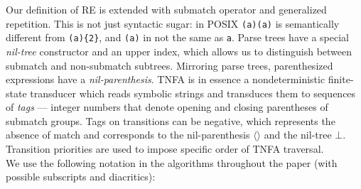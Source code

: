 \documentclass[AMA,STIX1COL]{WileyNJD-v2}
\newcommand{\Xm}{\langle\!\rangle}
\newcommand{\YN}{\mathbb{N}}
\begin{document}
Our definition of RE is extended with submatch operator and generalized repetition.
This is not just syntactic sugar: in POSIX \texttt{(a)(a)} is semantically different from \texttt{(a)\{2\}},
and \texttt{(a)} in not the same as \texttt{a}.
Parse trees have a special \emph{nil-tree} constructor
and an upper index, which allows us to distinguish between submatch and non-submatch subtrees.
Mirroring parse trees, parenthesized expressions have a \emph{nil-parenthesis}.
TNFA is in essence a nondeterministic finite-state transducer
which reads symbolic strings and transduces them to sequences of
\emph{tags} --- integer numbers that denote opening and closing parentheses of submatch groups.
Tags on transitions can be negative, which represents the absence of match and corresponds to the nil-parenthesis $\Xm$ and the nil-tree $\bot$.
Transition priorities are used to impose specific order of TNFA traversal.
\\

We use the following notation in the algorithms throughout the paper
(with possible subscripts and diacritics):
\end{document}

